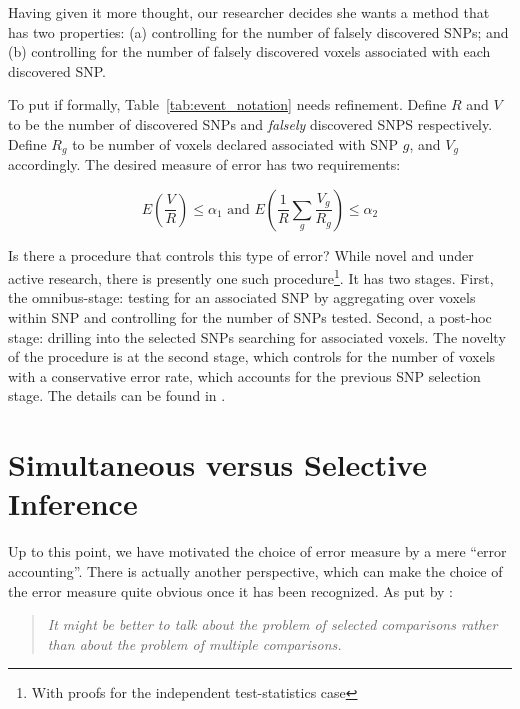 \documentclass[review,12pt]{article}
\theoremstyle{definition}
\theoremstyle{definition}
\begin{document}
Having given it more thought, our researcher decides she wants a method that has two properties: 
(a) controlling for the number of falsely discovered SNPs; and 
(b) controlling for the number of falsely discovered voxels associated with each discovered SNP. 

To put if formally, Table~\ref{tab:event_notation} needs refinement. 
Define $R$ and $V$ to be the number of discovered SNPs and \emph{falsely} discovered SNPS respectively. 
Define $R_g$ to be number of voxels declared associated with SNP $g$, and $V_g$ accordingly. The desired measure of error has two requirements: 

\begin{equation} \label{eq:hirarchial_error}
 E \left(\frac{V}{R} \right)\leq \alpha_1 
\text{ and } 
E \left( \frac{1}{R}\sum_{g} \frac{V_{g}}{R_{g}} \right)\leq \alpha_2
\end{equation}


Is there a procedure that controls this type of error? While novel and under active research, there is presently one such procedure\footnote{ With proofs for the independent test-statistics case}. It has two stages. 
First, the omnibus-stage:  testing for an associated SNP by aggregating over voxels within SNP and controlling for the number of SNPs tested. Second, a post-hoc stage: drilling into the selected SNPs searching for associated voxels. The novelty of the procedure is at the second stage, which controls for the number of voxels with a conservative error rate, which accounts for the previous SNP selection stage. 
The details can be found in \cite{benjamini_adjusting_2013}.




\section{Simultaneous versus Selective Inference}
Up to this point, we have motivated the choice of error measure by a mere ``error accounting''. 
There is actually another perspective, which can make the choice of the error measure quite obvious once it has been recognized. 
As put by \citet{cox_remark_1965}:
\begin{quote}\em
It might be better to talk about the problem of selected comparisons rather than about the problem of multiple comparisons.
\end{quote}
\end{document}
